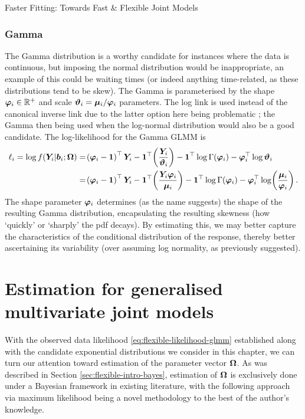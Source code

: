 \begin{chapter}{\label{cha:flexible}Faster Fitting: Towards Fast \& Flexible Joint Models}
\subsubsection*{Gamma}
The Gamma distribution is a worthy candidate for instances where the data is continuous, but imposing the normal distribution would be inappropriate, an example of this could be waiting times (or indeed anything time-related, as these distributions tend to be skew). The Gamma is parameterised by the shape $\bm{\varphi}_i\in\mathbb{R}^+$ and scale $\bm{\vartheta}_i=\bm{\mu}_i/\bm{\varphi}_i$ parameters. The log link is used instead of the canonical inverse link due to the latter option here being problematic \citep{BolkerGLMMFAQ}; the Gamma then being used when \eg the log-normal distribution would also be a good candidate. The log-likelihood for the Gamma GLMM is
\begin{align}
        \ell_i=\log f\lb\Y|\b;\bO\rb &= \lb\bphi-\bm{1}\rb^\top\Y-\boneT\lb\frac{\Y}{\bm{\vartheta}_i}\rb-\boneT\lgam{\bphi}-\bphi^\top\log\bm{\vartheta}_i \nonumber \\
        &=\lb\bphi-\bm{1}\rb^\top\Y-\boneT\lb\frac{\Y\bphi}{\bmu}\rb-\boneT\lgam{\bphi}-\bphi^\top\log\lb\frac{\bmu}{\bphi}\rb.
\label{eq:flexible-Gamma-ll}
\end{align}
The shape parameter $\bm{\varphi}_i$ determines (as the name suggests) the shape of the resulting Gamma distribution, encapsulating the resulting skewness (\ie how `quickly' or `sharply' the pdf decays). By estimating this, we may better capture the characteristics of the conditional distribution of the response, thereby better ascertaining its variability (over \eg assuming log normality, as previously suggested).
\resettocmain
\section{Estimation for generalised multivariate joint models}
With the observed data likelihood \eqref{eq:flexible-likelihood-glmm} established along with the candidate exponential distributions we consider in this chapter, we can turn our attention toward estimation of the parameter vector $\bm{\mathrm{\Omega}}$. As was described in Section \ref{sec:flexible-intro-bayes}, estimation of $\bm{\mathrm{\Omega}}$ is exclusively done under a Bayesian framework in existing literature, with the following approach via maximum likelihood being a novel methodology to the best of the author's knowledge. 


\end{chapter}
